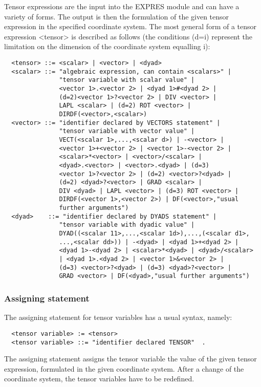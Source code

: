      Tensor expressions  are the  input into  the EXPRES  module and can
have a variety of forms. The output is then the formulation of the given
tensor expression  in the  specified coordinate system. The most general
form of a  tensor  expression  <tensor>  is  described  as  follows (the
conditions  (d=i)  represent  the  limitation  on  the  dimension of the
coordinate system equalling i):
\begin{verbatim}
  <tensor> ::= <scalar> | <vector> | <dyad>
  <scalar> ::= "algebraic expression, can contain <scalars>" |
               "tensor variable with scalar value" |
               <vector 1>.<vector 2> | <dyad 1>#<dyad 2> |
               (d=2)<vector 1>?<vector 2> | DIV <vector> |
               LAPL <scalar> | (d=2) ROT <vector> |
               DIRDF(<vector>,<scalar>)
  <vector> ::= "identifier declared by VECTORS statement" |
               "tensor variable with vector value" |
               VECT(<scalar 1>,...,<scalar d>) | -<vector> |
               <vector 1>+<vector 2> | <vector 1>-<vector 2> |
               <scalar>*<vector> | <vector>/<scalar> |
               <dyad>.<vector> | <vector>.<dyad> | (d=3)
               <vector 1>?<vector 2> | (d=2) <vector>?<dyad> |
               (d=2) <dyad>?<vector> | GRAD <scalar> |
               DIV <dyad> | LAPL <vector> | (d=3) ROT <vector> |
               DIRDF(<vector 1>,<vector 2>) | DF(<vector>,"usual
               further arguments")
  <dyad>    ::= "identifier declared by DYADS statement" |
               "tensor variable with dyadic value" |
               DYAD((<scalar 11>,...,<scalar 1d>),...,(<scalar d1>,
               ...,<scalar dd>)) | -<dyad> | <dyad 1>+<dyad 2> |
               <dyad 1>-<dyad 2> | <scalar>*<dyad> | <dyad>/<scalar>
               | <dyad 1>.<dyad 2> | <vector 1>&<vector 2> |
               (d=3) <vector>?<dyad> | (d=3) <dyad>?<vector> |
               GRAD <vector> | DF(<dyad>,"usual further arguments")
\end{verbatim}

\subsubsection{Assigning statement}


     The assigning statement for  tensor variables  has a  usual syntax,
namely:
\begin{verbatim}
  <tensor variable> := <tensor>
  <tensor variable> ::= "identifier declared TENSOR"  .
\end{verbatim}
The assigning  statement assigns  the tensor  variable the  value of the
given tensor expression,  formulated  in  the  given  coordinate system.
After a change of the coordinate system, the tensor variables have to be
redefined.

